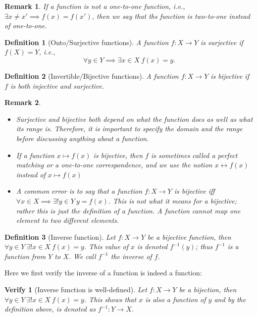\documentclass[a4paper]{book}
\theoremstyle{break}
\newtheorem{definition}{Definition}[section]
\newtheorem{remark}{Remark}[section]
\newtheorem*{verify}{Verify}
\begin{document}
			\begin{remark}
				If a function is not a one-to-one function, \textit{i.e.,}$\exists x\neq x'\!\implies\!f(x)=f(x')$, then we say that ths function is two-to-one instead of one-to-one.
			\end{remark}
			\begin{definition}[Onto/Surjective functions]
				A function $f:X\to Y$ is surjective if $f(X)=Y$, \textit{i.e.,}
				$$\forall y\in Y\implies\exists x\in X~f(x)=y.$$
			\end{definition}
			\begin{definition}[Invertible/Bijective functions]
				A function $f:X\to Y$ is bijective if $f$ is both injective and surjective.
			\end{definition}
			\begin{remark}~
				\begin{itemize}
					\item Surjective and bijective both depend on what the function does as well as what its range is. Therefore, it is important to specify the domain and the range before discussing anything about a function.
					\item If a function $x\mapsto f(x)$ is bijective, then $f$ is sometimes called a perfect matching or a one-to-one correspondence, and we use the notion $x\leftrightarrow f(x)$ instead of $x\mapsto f(x)$
					\item A common error is to say that a function $f:X\to Y$ is bijective iff $\forall x\in X\implies\exists!y\in Y~y=f(x)$. This is not what it means for a bijective; rather this is just the definition of a function. A function cannot map one element to two different elements.
				\end{itemize}
			\end{remark}
			\begin{definition}[Inverse function]
				Let $f:X\to Y$ be a bijective function, then $\forall y\in Y~\exists!x\in X~f(x)=y$. This value of $x$ is denoted $f^{-1}(y)$; thus $f^{-1}$ is a function from $Y$ to $X$. We call $f^{-1}$ the inverse of $f$.
			\end{definition}
			Here we first verify the inverse of a function is indeed a function:
			\begin{verify}[Inverse function is well-defined]
				Let $f:X\to Y$ be a bijection, then $\forall y\in Y~\exists!x\in X~f(x)=y$. This shows that $x$ is also a function of $y$ and by the definition above, is denoted as $f^{-1}:Y\to X$.
			\end{verify}
\end{document}
